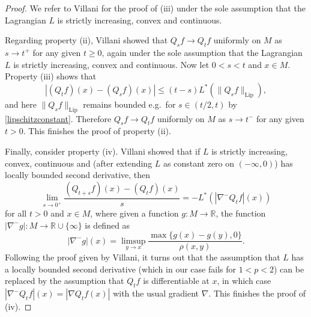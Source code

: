 \documentclass[11pt,a4paper]{article}
\theoremstyle{definition}
\begin{document}
\begin{proof}
We refer to Villani \cite[p.\ 626]{VI} for the proof of (iii) under the sole assumption that the Lagrangian $L$ is strictly increasing, convex and continuous.

Regarding property (ii), Villani showed that $Q_s f \to Q_t f$ uniformly on $M$ as $s \to t^+$ for any given $t \ge 0$, again under the sole assumption that the Lagrangian $L$ is strictly increasing, convex and continuous. Now let $0<s<t$ and $x \in M$. Property (iii) shows that
\[ |(Q_t f)(x) - (Q_s f)(x)| \le (t-s) L^* (\| Q_s f \|_{\mathrm{Lip}}) , \]
and here $\| Q_s f \|_{\mathrm{Lip}}$ remains bounded e.g.\ for $s \in (t/2,t)$ by \eqref{lipschitzconstant}. Therefore $Q_s f \to Q_t f$ uniformly on $M$ as $s \to t^-$ for any given $t>0$. This finishes the proof of property (ii).

Finally, consider property (iv). Villani showed that if $L$ is strictly increasing, convex, continuous and (after extending $L$ as constant zero on $(-\infty, 0)$) has locally bounded second derivative, then
\[ \lim_{s \to 0^+} \frac{(Q_{t+s} f)(x) - (Q_t f)(x)}{s} = - L^* (|\nabla^{-} Q_t f|(x)) \]
for all $t>0$ and $x \in M$, where given a function $g: M \to \mathbb{R}$, the function $|\nabla^{-}g|: M \to \mathbb{R} \cup \{ \infty \}$ is defined as
\[ |\nabla^{-} g|(x) = \limsup_{y \to x} \frac{\max \{ g(x)-g(y), 0 \}}{\rho (x,y)} . \]
Following the proof given by Villani, it turns out that the assumption that $L$ has a locally bounded second derivative (which in our case fails for $1<p<2$) can be replaced by the assumption that $Q_t f$ is differentiable at $x$, in which case $|\nabla^{-}Q_t f|(x) =|\nabla Q_t f(x)|$ with the usual gradient $\nabla$. This finishes the proof of (iv).


\end{proof}
\end{document}
